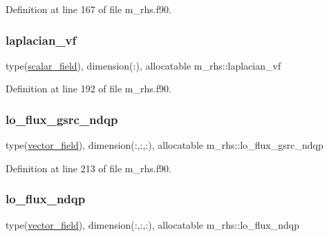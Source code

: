 Definition at line 167 of file m\+\_\+rhs.\+f90.

\mbox{\label{namespacem__rhs_aa2587a1fc99a23d4d7fe552602e72bbc}} 
\subsubsection{\texorpdfstring{laplacian\+\_\+vf}{laplacian\_vf}}
{\footnotesize\ttfamily type(\hyperlink{structm__derived__types_1_1scalar__field}{scalar\+\_\+field}), dimension(\+:), allocatable m\+\_\+rhs\+::laplacian\+\_\+vf}



Definition at line 192 of file m\+\_\+rhs.\+f90.

\mbox{\label{namespacem__rhs_af07ecd26e050830ebeedaae6da3eb72a}} 
\subsubsection{\texorpdfstring{lo\+\_\+flux\+\_\+gsrc\+\_\+ndqp}{lo\_flux\_gsrc\_ndqp}}
{\footnotesize\ttfamily type(\hyperlink{structm__derived__types_1_1vector__field}{vector\+\_\+field}), dimension(\+:,\+:,\+:), allocatable m\+\_\+rhs\+::lo\+\_\+flux\+\_\+gsrc\+\_\+ndqp}



Definition at line 213 of file m\+\_\+rhs.\+f90.

\mbox{\label{namespacem__rhs_a3b8952eebc8ad3082a6dae29c2ddd480}} 
\subsubsection{\texorpdfstring{lo\+\_\+flux\+\_\+ndqp}{lo\_flux\_ndqp}}
{\footnotesize\ttfamily type(\hyperlink{structm__derived__types_1_1vector__field}{vector\+\_\+field}), dimension(\+:,\+:,\+:), allocatable m\+\_\+rhs\+::lo\+\_\+flux\+\_\+ndqp}



